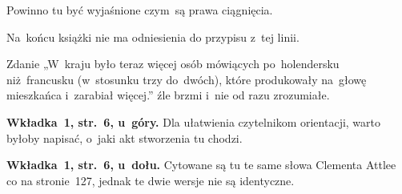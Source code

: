 \documentclass[a4paper,11pt]{article}
\numberwithin{equation}{section}
\begin{document}
\VerSpaceFour





\noindent
{} Powinno tu być wyjaśnione czym~są prawa ciągnięcia.

\VerSpaceFour





\noindent
{} Na~końcu książki nie ma odniesienia do przypisu z~tej
linii.

\VerSpaceFour





\noindent
{} Zdanie „W~kraju było teraz więcej osób mówiących
po~holendersku niż~francusku (w~stosunku trzy do~dwóch), które produkowały
na~głowę mieszkańca i~zarabiał więcej.” źle brzmi i~nie od razu zrozumiałe.

\VerSpaceFour





\noindent
\textbf{Wkładka~1, str.~6, u~góry.} Dla ułatwienia czytelnikom orientacji,
warto byłoby napisać, o~jaki akt stworzenia tu chodzi.

\VerSpaceFour





\noindent
\textbf{Wkładka~1, str.~6, u~dołu.} Cytowane są tu te same słowa Clementa
Attlee co na stronie~127, jednak te dwie wersje nie są identyczne.





\newpage

\end{document}
